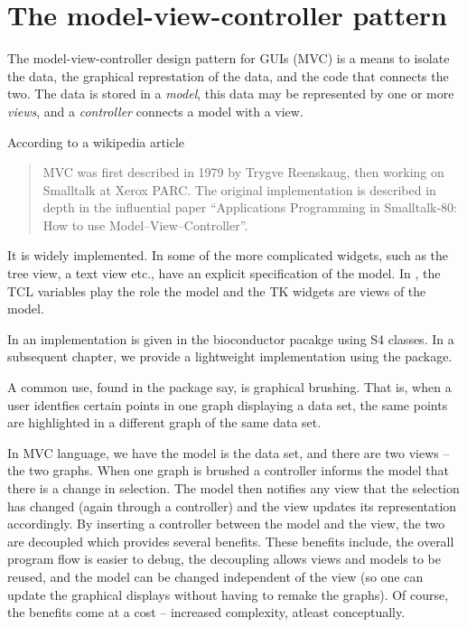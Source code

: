 \documentclass{memoir}
\begin{document}
\thispagestyle{empty}




\chapter{The model-view-controller pattern}

The model-view-controller design pattern for GUIs (MVC) is a means to isolate the
data, the graphical represtation of the data, and the code that
connects the two. The data is stored in a \textit{model}, this data
may be represented by one or more \textit{views}, and a
\textit{controller} connects a model with a view. 


According to a wikipedia article
\begin{quotation}
  MVC was first described in 1979 by Trygve Reenskaug, then working
  on Smalltalk at Xerox PARC. The original implementation is described
  in depth in the influential paper ``Applications Programming in
  Smalltalk-80: How to use Model–View–Controller''.
\end{quotation}
It is widely implemented. In  some of the more complicated
widgets, such as the tree view, a text view etc., have an explicit
specification of the model. In , the TCL variables play the
role the model and the TK widgets are views of the model. 

In \R\/ an implementation is given in the bioconductor pacakge
 using S4 classes. In a subsequent chapter, we provide
a lightweight implementation using the  package.

A common use, found in the  package say, is graphical
brushing. That is, when a user identfies certain points in one graph
displaying a data set, the same points are highlighted in a different
graph of the same data set. 

In MVC language, we have the model is the data set, and there are two
views -- the two graphs. When one graph is brushed a controller
informs the model that there is a change in selection. The model then
notifies any view that the selection has changed (again through a
controller) and the view updates its representation accordingly. By
inserting a controller between the model and the view, the two are
decoupled which provides several benefits. These benefits include, the
overall program flow is easier to debug, the decoupling allows views
and models to be reused, and the model can be changed independent of the
view (so one can update the graphical displays without having to
remake the graphs). Of course, the benefits come at a cost --
increased complexity, atleast conceptually.
\end{document}
